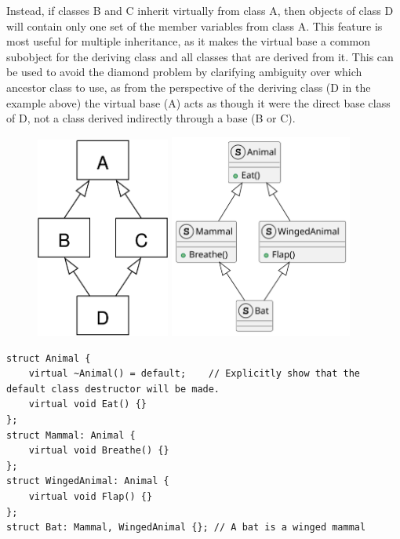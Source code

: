 \documentclass[a4paper,12pt,notitlepage]{article}
\begin{document}
Instead, if classes B and C inherit virtually from class A, then objects of class D will contain only one set of the member variables from class A. This feature is most useful for multiple inheritance, as it makes the virtual base a common subobject for the deriving class and all classes that are derived from it. This can be used to avoid the diamond problem by clarifying ambiguity over which ancestor class to use, as from the perspective of the deriving class (D in the example above) the virtual base (A) acts as though it were the direct base class of D, not a class derived indirectly through a base (B or C).

\begin{figure}[H]
    \includegraphics[width=44mm]{Diamond_inheritance.png}
    \hspace{30mm}
    \includegraphics[width=60mm]{UML_virtual_inheritance.png}
    \centering
\end{figure}

\begin{verbatim}
struct Animal {
    virtual ~Animal() = default;    // Explicitly show that the default class destructor will be made.
    virtual void Eat() {}
};
struct Mammal: Animal {
    virtual void Breathe() {}
};
struct WingedAnimal: Animal {
    virtual void Flap() {}
};
struct Bat: Mammal, WingedAnimal {}; // A bat is a winged mammal
\end{verbatim}
\end{document}
